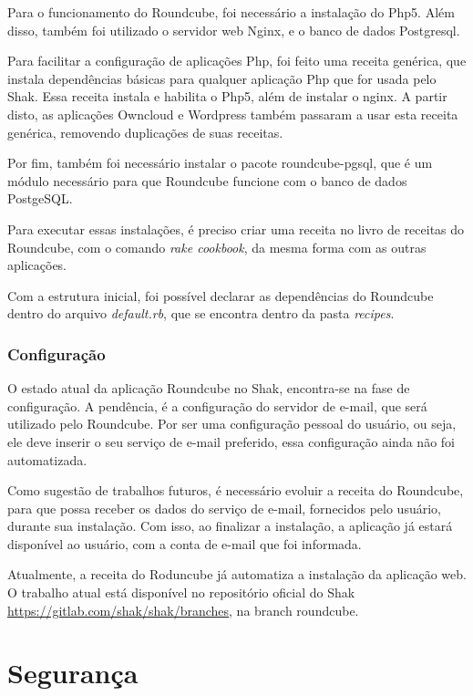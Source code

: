 Para o funcionamento do Roundcube, foi necessário a instalação do Php5. Além
disso, também foi utilizado o servidor web Nginx, e o 
banco de dados Postgresql.

Para facilitar a configuração de aplicações Php, foi feito uma receita genérica,
que instala dependências básicas para qualquer aplicação Php que for usada pelo
Shak. Essa receita instala e habilita o Php5, além de instalar o nginx. A partir
disto, as aplicações Owncloud e Wordpress também passaram a usar esta receita
genérica, removendo duplicações de suas receitas.

Por fim, também foi necessário instalar o pacote roundcube-pgsql, que é um módulo 
necessário para que Roundcube funcione com o banco de dados PostgeSQL.
 
Para executar essas instalações, é preciso criar uma receita no livro de receitas
do Roundcube, com o comando \textit{rake cookbook}, da mesma forma com as outras aplicações.
 
Com a estrutura inicial, foi possível declarar as dependências do Roundcube
dentro do arquivo \textit{default.rb}, que se encontra dentro da pasta 
\textit{recipes}. 

\subsubsection{Configuração}

O estado atual da aplicação Roundcube no Shak, encontra-se na fase de configuração. A pendência,
é a configuração do servidor de e-mail, que será utilizado pelo Roundcube. Por ser
uma configuração pessoal do usuário, ou seja, ele deve inserir o seu serviço
de e-mail preferido, essa configuração ainda não foi automatizada. 

Como sugestão de trabalhos futuros, é necessário evoluir a receita do Roundcube, 
para que possa receber os dados do serviço de e-mail, fornecidos pelo usuário, 
durante sua instalação. Com isso, ao finalizar a instalação, a aplicação já 
estará disponível ao usuário, com a conta de e-mail que foi informada.

Atualmente, a receita do Roduncube já automatiza a instalação da aplicação web. 
O trabalho atual está disponível no repositório oficial do Shak \url{https://gitlab.com/shak/shak/branches}, na branch roundcube.

\section{Segurança}
\label{sub:seguranca}

